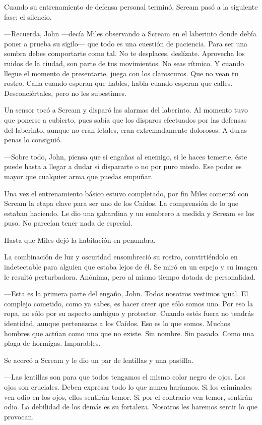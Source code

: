 Cuando su entrenamiento de defensa personal terminó, Scream pasó a la siguiente fase: el silencio.

---Recuerda, John ---decía Miles observando a Scream en el laberinto donde debía poner a prueba su sigilo--- que todo es una cuestión de paciencia. Para ser una sombra debes comportarte como tal. No te desplaces, deslízate. Aprovecha los ruidos de la ciudad, son parte de tus movimientos. No seas rítmico. Y cuando llegue el momento de presentarte, juega con los claroscuros. Que no vean tu rostro. Calla cuando esperan que hables, habla cuando esperan que calles. Desconciértales, pero no les subestimes.

Un sensor tocó a Scream y disparó las alarmas del laberinto. Al momento tuvo que ponerse a cubierto, pues sabía que los disparos efectuados por las defensas del laberinto, aunque no eran letales, eran extremadamente dolorosos. A duras penas lo consiguió.

---Sobre todo, John, piensa que si engañas al enemigo, si le haces temerte, éste puede hasta a llegar a dudar si dispararte o no por puro miedo. Ese poder es mayor que cualquier arma que puedas empuñar.

Una vez el entrenamiento básico estuvo completado, por fin Miles comenzó con Scream la etapa clave para ser uno de los Caídos. La comprensión de lo que estaban haciendo. Le dio una gabardina y un sombrero a medida y Scream se los puso. No parecían tener nada de especial.

Hasta que Miles dejó la habitación en penumbra.

La combinación de luz y oscuridad ensombreció su rostro, convirtiéndolo en indetectable para alguien que estaba lejos de él. Se miró en un espejo y su imagen le resultó perturbadora. Anónima, pero al mismo tiempo dotada de personalidad.

---Esta es la primera parte del engaño, John. Todos nosotros vestimos igual. El complejo cometido, como ya sabes, es hacer creer que sólo somos uno. Por eso la ropa, no sólo por su aspecto ambiguo y protector. Cuando estés fuera no tendrás identidad, aunque pertenezcas a los Caídos. Eso es lo que somos. Muchos hombres que actúan como uno que no existe. Sin nombre. Sin pasado. Como una plaga de hormigas. Imparables.

Se acercó a Scream y le dio un par de lentillas y una pastilla.

---Las lentillas son para que todos tengamos el mismo color negro de ojos. Los ojos son cruciales. Deben expresar todo lo que nunca haríamos. Si los criminales ven odio en los ojos, ellos sentirán temor. Si por el contrario ven temor, sentirán odio. La debilidad de los demás es su fortaleza. Nosotros les haremos sentir lo que provocan.

